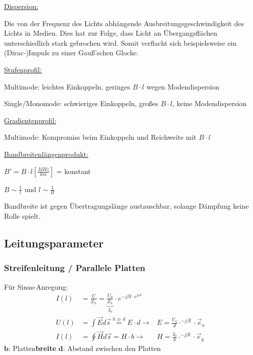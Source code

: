 \begin{description}
    \item \underline{Dispersion:}

          {\small Die von der Frequenz des Lichts abhängende
              Ausbreitungsgeschwindigkeit des Lichts in Medien. Dies hat zur Folge,
              dass Licht an Übergangsflächen unterschiedlich stark gebrochen wird.
              Somit verflacht sich beispielsweise ein (Dirac-)Impuls zu einer Gauß'schen
              Glocke.
          }
    \item \underline{Stufenprofil:}

          {\small Multimode: leichtes Einkoppeln, geringes $B\cdot l$ wegen
              Modendispersion

              Single/Monomode: schwieriges Einkoppeln, großes $B\cdot l$, keine
              Modendispersion
          }
    \item \underline{Gradientenprofil:}

          {\small Multimode: Kompromiss beim Einkoppeln und Reichweite mit $B\cdot l$}
    \item \underline{Bandbreitenlängenprodukt:}

          {\small $B' =  B\cdot l[\frac{MHz}{km}]$ = konstant

              $B \sim \frac{1}{l}$ und $l\sim \frac{1}{B}$

              Bandbreite ist gegen Übertragungslänge austauschbar, solange
              Dämpfung keine Rolle spielt.
          }
\end{description}
\subsection{Leitungsparameter}
\subsubsection{Streifenleitung / Parallele Platten}
Für Sinus-Anregung:
\begin{align*}
	I(l) & = \frac{U}{Z_L} = \underbrace{\frac{U_0}{Z_L}}_{I_0}\cdot e^{-j\beta l\cdot e^{j\omega t}}                         \\
	U(l) & = \int \vec{E} d\vec{s} \stackrel{b\gg d}{=} E\cdot d \rightarrow  &E = \frac{U_0}{d}\cdot^{-j\beta l}\cdot\vec{e}_x \\
	I(l) & = \oint \vec{H} d\vec{s} =  H\cdot b \rightarrow &H = \frac{I_0}{b}\cdot^{-j\beta l}\cdot\vec{e}_y                  %
\end{align*}
$ \mathbf{b} $: Platten\textbf{breite} \qquad $ \mathbf{d} $: Abstand zwischen den Platten\\

